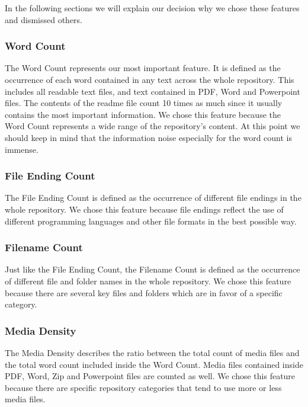 \documentclass[paper=A4,pagesize=auto,12pt,headinclude=true,footinclude=true,BCOR=0mm,DIV=calc]{scrartcl}
\begin{document}
	In the following sections we will explain our decision why we chose these features and dismissed others.
	
	\subsubsection{Word Count}
	The Word Count represents our most important feature. It is defined as the occurrence of each word contained in any text across the whole repository. This includes all readable text files, and text contained in PDF, Word and Powerpoint files. The contents of the readme file count 10 times as much since it usually contains the most important information. 
	We chose this feature because the Word Count represents a wide range of the repository’s content. At this point we should keep in mind that the information noise especially for the word count is immense. 
	
	\subsubsection{File Ending Count}
	
	The File Ending Count is defined as the occurrence of different file endings in the whole repository. We chose this feature because file endings reflect the use of different programming languages and other file formats in the best possible way.
	
	\subsubsection{Filename Count}
	
	Just like the File Ending Count, the Filename Count is defined as the occurrence of different file and folder names in the whole repository.
	We chose this feature because there are several key files and folders which are in favor of a specific category.        
	
	\subsubsection{Media Density}
	
	The Media Density describes the ratio between the total count of media files and the total word count included inside the Word Count. Media files contained inside PDF, Word, Zip and Powerpoint files are counted as well. We chose this feature because there are specific repository categories that tend to use more or less media files.
	
\end{document}

